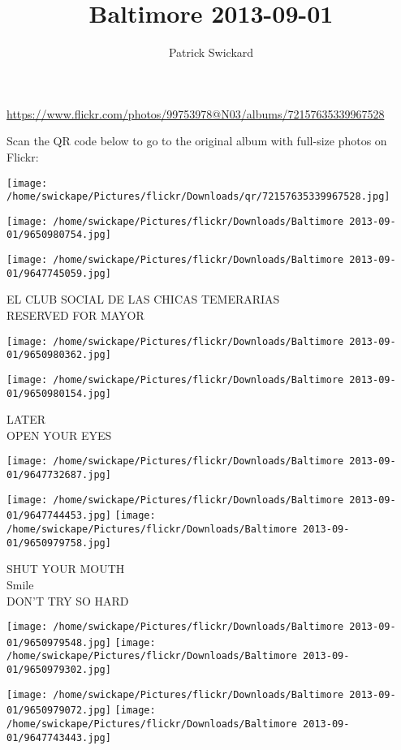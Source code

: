 \documentclass[10pt,letterpaper]{article}
\title{Baltimore 2013-09-01}
\author{Patrick Swickard}
\date{}
\begin{document}
\maketitle

\url{https://www.flickr.com/photos/99753978@N03/albums/72157635339967528}

Scan the QR code below to go to the original album with full-size photos on Flickr:

\texttt{[image: /home/swickape/Pictures/flickr/Downloads/qr/72157635339967528.jpg]}
\pagebreak

\texttt{[image: /home/swickape/Pictures/flickr/Downloads/Baltimore 2013-09-01/9650980754.jpg]}

\vspace{0.25in}
\texttt{[image: /home/swickape/Pictures/flickr/Downloads/Baltimore 2013-09-01/9647745059.jpg]}

EL CLUB SOCIAL DE LAS CHICAS TEMERARIAS\\
RESERVED FOR MAYOR
\pagebreak

\texttt{[image: /home/swickape/Pictures/flickr/Downloads/Baltimore 2013-09-01/9650980362.jpg]}

\vspace{0.25in}
\texttt{[image: /home/swickape/Pictures/flickr/Downloads/Baltimore 2013-09-01/9650980154.jpg]}

LATER\\
OPEN YOUR EYES
\pagebreak

\texttt{[image: /home/swickape/Pictures/flickr/Downloads/Baltimore 2013-09-01/9647732687.jpg]}

\vspace{0.25in}
\texttt{[image: /home/swickape/Pictures/flickr/Downloads/Baltimore 2013-09-01/9647744453.jpg]}
\texttt{[image: /home/swickape/Pictures/flickr/Downloads/Baltimore 2013-09-01/9650979758.jpg]}

SHUT YOUR MOUTH\\
Smile\\
DON'T TRY SO HARD
\pagebreak

\texttt{[image: /home/swickape/Pictures/flickr/Downloads/Baltimore 2013-09-01/9650979548.jpg]}
\texttt{[image: /home/swickape/Pictures/flickr/Downloads/Baltimore 2013-09-01/9650979302.jpg]}

\texttt{[image: /home/swickape/Pictures/flickr/Downloads/Baltimore 2013-09-01/9650979072.jpg]}
\texttt{[image: /home/swickape/Pictures/flickr/Downloads/Baltimore 2013-09-01/9647743443.jpg]}
\end{document}
